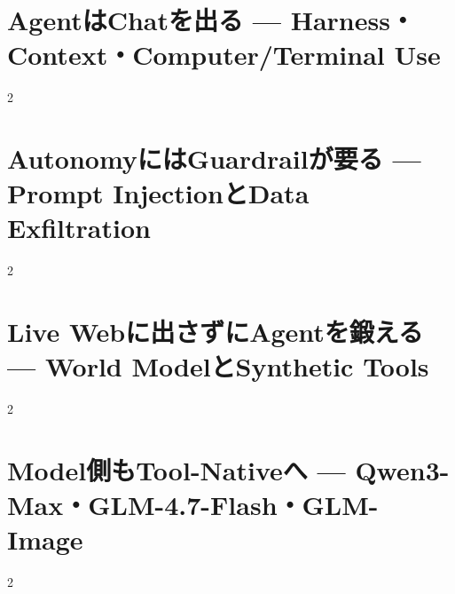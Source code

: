 \documentclass[lualatex,a4paper,11pt]{jlreq}
\begin{document}
\surveycover
\clearpage


\clearpage
\section{AgentはChatを出る — Harness・Context・Computer/Terminal Use}
\label{pkg:agent-stack-leaves-chat}

\medskip
\begin{multicols}{2}

\end{multicols}

\medskip


\Needspace{0.45\textheight}
\bigskip
\section{AutonomyにはGuardrailが要る — Prompt InjectionとData Exfiltration}
\label{pkg:autonomy-needs-guardrails}

\medskip
\begin{multicols}{2}

\end{multicols}

\medskip


\Needspace{0.45\textheight}
\bigskip
\section{Live Webに出さずにAgentを鍛える — World ModelとSynthetic Tools}
\label{pkg:training-agents-offline}

\medskip
\begin{multicols}{2}

\end{multicols}

\medskip


\Needspace{0.45\textheight}
\bigskip
\section{Model側もTool-Nativeへ — Qwen3-Max・GLM-4.7-Flash・GLM-Image}
\label{pkg:tool-native-models}

\medskip
\begin{multicols}{2}

\end{multicols}

\medskip

\end{document}
